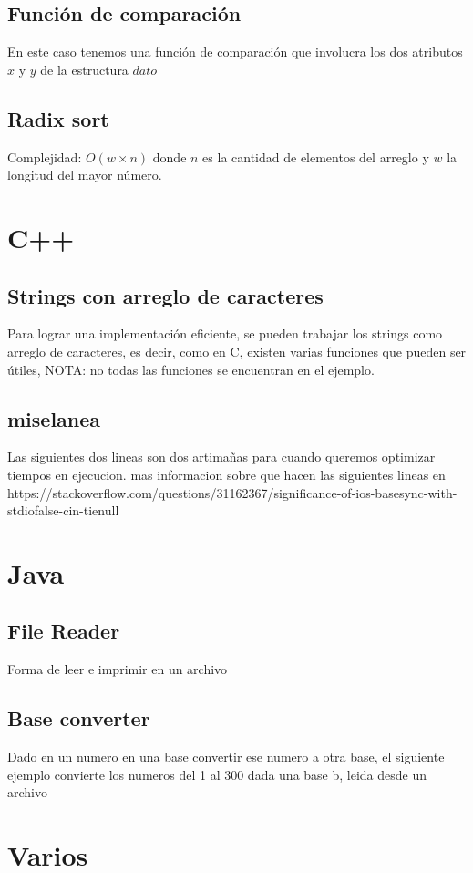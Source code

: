 \documentclass[10pt,letterpaper,twocolumn]{article}
\newcommand{\source}[1]{
  
  \dotfill
}
\begin{document}
  \subsection{Función de comparación}
  En este caso tenemos una función de comparación que involucra los dos atributos $x$ y $y$ de la estructura $dato$
  \source{./src/struct.cpp}
  \subsection{Radix sort}
  Complejidad: $O(w \times n)$ donde $n$ es la cantidad de elementos del arreglo y $w$ la longitud del mayor número.\\
  \source{./src/radixSort.cpp}

\section{C++}
  \subsection{Strings con arreglo de caracteres}
  Para lograr una implementación eficiente, se pueden trabajar los strings como arreglo de caracteres, es decir, como en C, existen varias funciones que pueden ser útiles, NOTA: no todas las funciones se encuentran en el ejemplo.
  \source{./src/getsScanfGetline.cpp}
  
  \subsection{miselanea}
  
  Las siguientes dos lineas son dos artimañas para cuando queremos optimizar tiempos en ejecucion. mas informacion sobre que hacen las siguientes lineas en https://stackoverflow.com/questions/31162367/significance-of-ios-basesync-with-stdiofalse-cin-tienull
    \source{./src/tricks.cpp}

\section{Java}

\subsection{File Reader}
Forma de leer e imprimir en un archivo 
\source{./src/fileIn.java}

 \subsection{Base converter}
 Dado en un numero en una base convertir ese numero a otra base, el siguiente ejemplo convierte los numeros del 1 al 300 dada una base b, leida desde un archivo
 \source{./src/palsquare.java}


\section{Varios}
\end{document}
